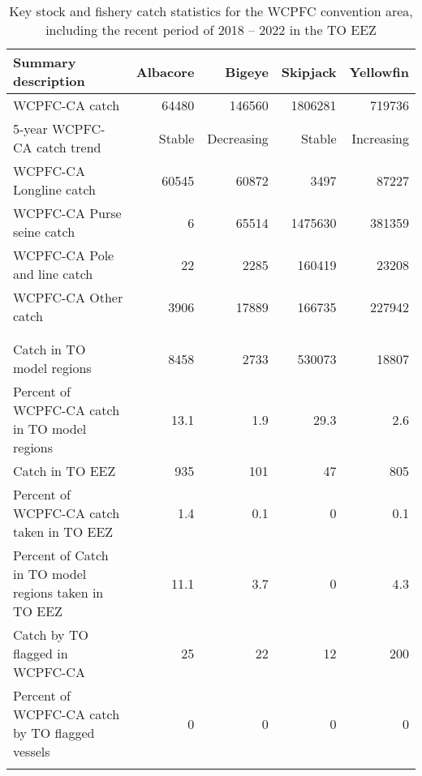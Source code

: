 \begin{longtable}{lrrrr}
\caption{Key stock and fishery catch statistics for the WCPFC convention area, including the recent period of 2018 -- 2022 in the TO EEZ} \\ 
  \hline
Summary description & Albacore & Bigeye & Skipjack & Yellowfin \\ 
  \hline
WCPFC-CA catch & 64480 & 146560 & 1806281 & 719736 \\ 
  5-year WCPFC-CA catch trend & Stable & Decreasing & Stable & Increasing \\ 
  WCPFC-CA Longline catch & 60545 & 60872 & 3497 & 87227 \\ 
  WCPFC-CA Purse seine catch & 6 & 65514 & 1475630 & 381359 \\ 
  WCPFC-CA Pole and line catch & 22 & 2285 & 160419 & 23208 \\ 
  WCPFC-CA Other catch & 3906 & 17889 & 166735 & 227942 \\ 
   &  &  &  &  \\ 
   &  &  &  &  \\ 
   \hline
Catch in TO model regions & 8458 & 2733 & 530073 & 18807 \\ 
  Percent of WCPFC-CA catch in TO model regions & 13.1 & 1.9 & 29.3 & 2.6 \\ 
  Catch in TO EEZ & 935 & 101 & 47 & 805 \\ 
  Percent of WCPFC-CA catch taken in TO EEZ & 1.4 & 0.1 & 0 & 0.1 \\ 
  Percent of Catch in TO model regions taken in TO EEZ & 11.1 & 3.7 & 0 & 4.3 \\ 
  Catch by TO flagged in WCPFC-CA & 25 & 22 & 12 & 200 \\ 
  Percent of WCPFC-CA catch by TO flagged vessels & 0 & 0 & 0 & 0 \\ 
  \hline
\label{cat_sum_tab}
\end{longtable}
